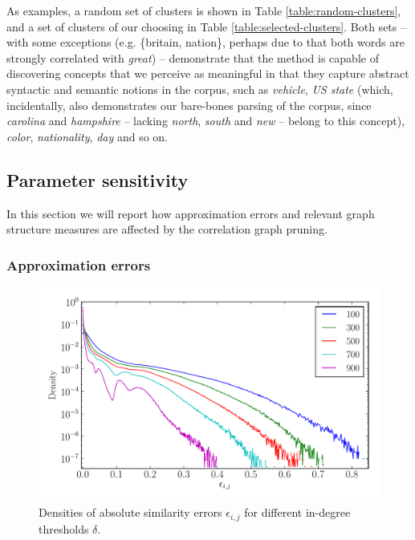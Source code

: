 \documentclass{kais}
\begin{document}
As examples, a random set of clusters is shown in Table \ref{table:random-clusters}, and a set of clusters of our choosing in 
Table \ref{table:selected-clusters}. Both sets -- with some exceptions (e.g. \{britain, nation\}, perhaps due to that both
words are strongly correlated with \emph{great}) -- demonstrate that the method is capable of discovering 
concepts that we perceive as meaningful in that they capture abstract syntactic and semantic notions in the corpus, such as
\emph{vehicle}, \emph{US state} (which, incidentally, also demonstrates our bare-bones parsing of the corpus,
since \emph{carolina} and \emph{hampshire} -- lacking \emph{north}, \emph{south} and \emph{new} -- belong to this concept),
\emph{color}, \emph{nationality}, \emph{day} and so on.

\subsection{Parameter sensitivity}

In this section we will report how approximation errors and relevant graph structure measures are affected by the 
correlation graph pruning.

\subsubsection{Approximation errors}
\label{subsubsec: approximation-errors}

\begin{figure}
\centerline{\includegraphics[width=0.75\columnwidth]{figures/1446451652-absolute_error.pdf}}
\caption{Densities of absolute similarity errors $\epsilon_{i,j}$ for different in-degree thresholds $\delta$.}
\label{fig:abs-error}
\end{figure}
\end{document}
